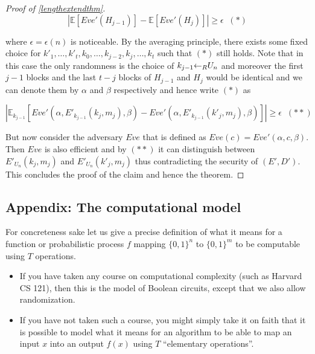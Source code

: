 \begin{proof}[Proof of \cref{lengthextendthm}]
\begin{equation*}
\left| {\mathbb{E}}[ Eve'(H_{j-1})] - {\mathbb{E}}[ Eve'(H_j)]\right|\geq \epsilon \;\;(*)
\end{equation*}

where \(\epsilon = \epsilon(n)\) is noticeable. By the averaging
principle, there exists some fixed choice for
\(k'_1,\ldots,k'_t,k_0,\ldots,k_{j-2},k_j,\ldots,k_t\) such that \((*)\)
still holds. Note that in this case the only randomness is the choice of
\(k_{j-1}{\leftarrow_{\tiny R}}U_n\) and moreover the first \(j-1\)
blocks and the last \(t-j\) blocks of \(H_{j-1}\) and \(H_j\) would be
identical and we can denote them by \(\alpha\) and \(\beta\)
respectively and hence write \((*)\) as

\begin{equation*}
\left| {\mathbb{E}}_{k_{j-1}}[ Eve'(\alpha,E'_{k_{j-1}}(k_j,m_j),\beta) - Eve'(\alpha,E'_{k_{j-1}}(k'_j,m_j),\beta) ] \right| \geq \epsilon \;\;(**)
\end{equation*}

But now consider the adversary \(Eve\) that is defined as
\(Eve(c) = Eve'(\alpha,c,\beta)\). Then \(Eve\) is also efficient and by
\((**)\) it can distinguish between \(E'_{U_n}(k_j,m_j)\) and
\(E'_{U_n}(k'_j,m_j)\) thus contradicting the security of \((E',D')\).
This concludes the proof of the claim and hence the theorem.

\end{proof}

\subsection{Appendix: The computational
model}\label{2-Appendix-The-computati}

For concreteness sake let us give a precise definition of what it means
for a function or probabilistic process \(f\) mapping \(\{0,1\}^n\) to
\(\{0,1\}^m\) to be computable using \(T\) operations.

\begin{itemize}
\item
  If you have taken any course on computational complexity (such as
  Harvard CS 121), then this is the model of Boolean circuits, except
  that we also allow randomization.
\item
  If you have not taken such a course, you might simply take it on faith
  that it is possible to model what it means for an algorithm to be able
  to map an input \(x\) into an output \(f(x)\) using \(T\) ``elementary
  operations''.
\end{itemize}

